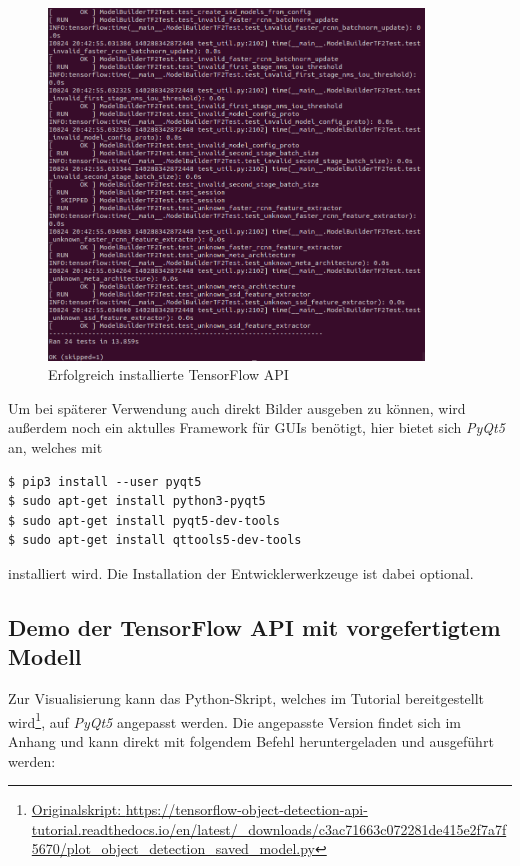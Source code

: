 \documentclass[12pt, oneside]{article}
\begin{document}
\begin{figure}[ht]
	\centering
	\includegraphics[width=0.89\textwidth]{Bilder/misc/erfolgreiche Installation.png}
	\caption{Erfolgreich installierte TensorFlow API}
	\label{fig:Installation}
\end{figure}
Um bei späterer Verwendung auch direkt Bilder ausgeben zu können, wird außerdem noch ein aktulles Framework für GUIs benötigt, hier bietet sich \textit{PyQt5} an, welches mit 

\begin{verbatim}    
$ pip3 install --user pyqt5  
$ sudo apt-get install python3-pyqt5  
$ sudo apt-get install pyqt5-dev-tools
$ sudo apt-get install qttools5-dev-tools
\end{verbatim}
installiert wird. Die Installation der Entwicklerwerkzeuge ist dabei optional.


\subsection{Demo der TensorFlow API mit vorgefertigtem Modell} \label{Demo der TensorFlow API mit vorgefertigtem Modell}

Zur Visualisierung kann das Python-Skript, welches im Tutorial bereitgestellt wird\footnote{\href{https://tensorflow-object-detection-api-tutorial.readthedocs.io/en/latest/_downloads/c3ac71663c072281de415e2f7a7f5670/plot_object_detection_saved_model.py}{Originalskript: \url{ https://tensorflow-object-detection-api-tutorial.readthedocs.io/en/latest/_downloads/c3ac71663c072281de415e2f7a7f5670/plot_object_detection_saved_model.py}}}, auf \textit{PyQt5} angepasst werden. Die angepasste Version findet sich im Anhang und kann direkt mit folgendem Befehl heruntergeladen und ausgeführt werden:
\end{document}
